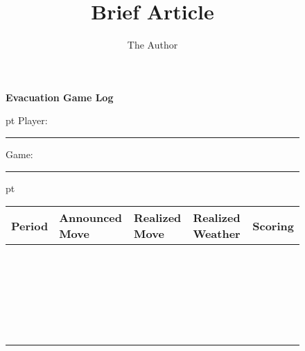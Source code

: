 \documentclass[11pt, oneside]{article}   	%
\title{Brief Article}
\author{The Author}
\begin{document}
\pagestyle{empty}
\begin{figure}[p]
\centerline{\Large\bf Evacuation Game Log}
 pt
Player: \rule[-2pt]{1in}{1pt} Game: \rule[-2pt]{1in}{1pt} 
 pt
\begin{center}
\begin{tabular}{|p{1.5cm}|p{2.8cm}|p{2.5cm}|p{2.5cm}|p{2.5cm}|} \hline
Period & Announced Move & Realized Move & Realized Weather & Scoring \\ \hline
 & & & & \\ \hline
  & & & & \\ \hline
   & & & & \\ \hline
    & & & & \\ \hline
     & & & & \\ \hline
      & & & & \\ \hline
 & & & & \\ \hline
  & & & & \\ \hline
   & & & & \\ \hline
    & & & & \\ \hline
     & & & & \\ \hline
      & & & & \\ \hline
 & & & & \\ \hline
  & & & & \\ \hline
   & & & & \\ \hline
    & & & & \\ \hline
     & & & & \\ \hline
      & & & & \\ \hline
 & & & & \\ \hline
  & & & & \\ \hline
   & & & & \\ \hline
    & & & & \\ \hline
     & & & & \\ \hline
      & & & & \\ \hline            
       \end{tabular}
 \end{center}
 \label{fig:evacuationLog}
\end{figure}
\end{document}
